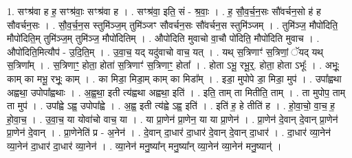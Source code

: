 \documentclass[17pt]{extarticle}
\begin{document}
1. सꣳश्र॑वा ह ह॒ सꣳश्र॑वाः॒ सꣳश्र॑वा ह । . सꣳश्र॑वा॒ इति॒ सं - श्र॒वाः॒ । . ह॒ सौ॒व॒र्च॒न॒सः सौ॑वर्चन॒सो ह॑ ह सौवर्चन॒सः । . सौ॒व॒र्च॒न॒स स्तुमि॑ञ्ज॒म् तुमि॑ञ्जꣳ सौवर्चन॒सः सौ॑वर्चन॒स स्तुमि॑ञ्जम् । . तुमि॑ञ्ज॒ मौपो॑दिति॒ मौपो॑दिति॒म् तुमि॑ञ्ज॒म् तुमि॑ञ्ज॒ मौपो॑दितिम् । . औपो॑दिति मुवाचो वा॒चौ पो॑दिति॒ मौपो॑दिति मुवाच । . औपो॑दिति॒मित्यौप॑ - उ॒दि॒ति॒म् । . उ॒वा॒च॒ यद् यदु॑वाचो वाच॒ यत् । . यथ् स॒त्रिणाꣳ॑ स॒त्रिणां॒ ॅयद् यथ् स॒त्रिणा᳚म् । . स॒त्रिणाꣳ॒॒ होता॒ होता॑ स॒त्रिणाꣳ॑ स॒त्रिणाꣳ॒॒ होता᳚ । . होता ऽभू॒ रभू॒र्॒. होता॒ होता ऽभूः᳚ । . अभूः॒ काम् का मभू॒ रभूः॒ काम् । . का मिडा॒ मिडा॒म् काम् का मिडा᳚म् । . इडा॒ मुपोपे डा॒ मिडा॒ मुप॑ । . उपा᳚ह्वथा अह्वथा॒ उपोपा᳚ह्वथाः । . अ॒ह्व॒था॒ इती त्य॑ह्वथा अह्वथा॒ इति॑ । . इति॒ ताम् ता मितीति॒ ताम् । . ता मुपोप॒ ताम् ता मुप॑ । . उपा᳚ह्वे ऽह्व॒ उपोपा᳚ह्वे । . अ॒ह्व॒ इती त्य॑ह्वे ऽह्व॒ इति॑ । . इति॑ ह॒ हे तीति॑ ह । . हो॒वा॒चो॒ वा॒च॒ ह॒ हो॒वा॒च॒ । . उ॒वा॒च॒ या योवा॑चो वाच॒ या । . या प्रा॒णेन॑ प्रा॒णेन॒ या या प्रा॒णेन॑ । . प्रा॒णेन॑ दे॒वान् दे॒वान् प्रा॒णेन॑ प्रा॒णेन॑ दे॒वान् । . प्रा॒णेनेति॑ प्र - अ॒नेन॑ । . दे॒वान् दा॒धार॑ दा॒धार॑ दे॒वान् दे॒वान् दा॒धार॑ । . दा॒धार॑ व्या॒नेन॑ व्या॒नेन॑ दा॒धार॑ दा॒धार॑ व्या॒नेन॑ । . व्या॒नेन॑ मनु॒ष्या᳚न् मनु॒ष्या᳚न् व्या॒नेन॑ व्या॒नेन॑ मनु॒ष्यान्॑ । \newline
\end{document}

